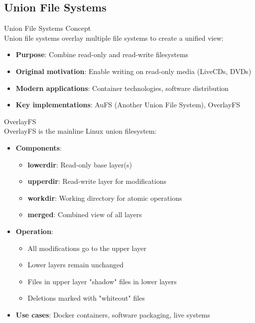 \subsection{Union File Systems}

\begin{definition}{Union File Systems Concept}\\
    Union file systems overlay multiple file systems to create a unified view:
    \begin{itemize}
        \item \textbf{Purpose}: Combine read-only and read-write filesystems
        \item \textbf{Original motivation}: Enable writing on read-only media (LiveCDs, DVDs)
        \item \textbf{Modern applications}: Container technologies, software distribution
        \item \textbf{Key implementations}: AuFS (Another Union File System), OverlayFS
    \end{itemize}
\end{definition}

\begin{definition}{OverlayFS}\\
    OverlayFS is the mainline Linux union filesystem:
    \begin{itemize}
        \item \textbf{Components}:
            \begin{itemize}
                \item \textbf{lowerdir}: Read-only base layer(s)
                \item \textbf{upperdir}: Read-write layer for modifications
                \item \textbf{workdir}: Working directory for atomic operations
                \item \textbf{merged}: Combined view of all layers
            \end{itemize}
        \item \textbf{Operation}:
            \begin{itemize}
                \item All modifications go to the upper layer
                \item Lower layers remain unchanged
                \item Files in upper layer "shadow" files in lower layers
                \item Deletions marked with "whiteout" files
            \end{itemize}
        \item \textbf{Use cases}: Docker containers, software packaging, live systems
    \end{itemize}
\end{definition}

